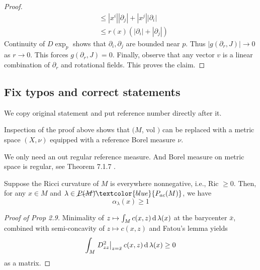 \begin{proof}
\[\begin{aligned}
                                                                     & \leq \left| x ^ { i } \right| \left| \partial _ { j } \right| + \left| x ^ { j } \right| \left| \partial _ { i } \right| \\
                                                                     & \leq r ( x ) \left( \left| \partial _ { i } \right| + \left| \partial _ { j } \right| \right)\end{aligned} \]
	Continuity of \( D \exp _ { p } \) shows that \( \partial _ { i } , \partial _ { j } \) are bounded near \( p .  \)
	Thus \( \left| g \left( \partial _ { r } , J \right) \right| \rightarrow 0 \) as \( r \rightarrow 0 .  \)
	This forces \( g \left( \partial _ { r } , J \right) = 0 .\)
	Finally, observe that any vector \( v \) is a linear combination of \( \partial _ { r } \) and rotational fields.
	This proves the claim.
\end{proof}

\subsection{Fix typos and correct statements}

We copy original statement and put reference number directly after it.

\begin{rmk}[Remark 2.2]
	Inspection of the proof above shows that \( ( M \), vol \( ) \) can be replaced with a  metric space \( ( X , \nu ) \) equipped with a reference Borel measure \( \nu \).
\end{rmk}

We only need an out regular reference measure. And Borel measure on metric space is regular, see Theorem 7.1.7 \cite{Bogachev2007}.

\begin{prop}
	Suppose the Ricci curvature of \( M \) is everywhere nonnegative, i.e., Ric \( \geq 0 . \) Then, for any \( x \in M \) and \( \lambda \in \cancel{P ( M )} \textcolor{blue}{P_{ac}(M)} \), we have
	\[ \alpha _ { \lambda } ( x ) \geq 1 \]
\end{prop}

\begin{proof}[Proof of Prop 2.9]
	Minimality of \( z \mapsto \int _ { M } c ( x , z ) \operatorname{d} \lambda ( x ) \) at the barycenter \( \bar { x } \), combined with semi-concavity of \( z \mapsto c ( x , z ) \) and Fatou's lemma yields
	\[
		\int _ { M } \left. D _ { z z } ^ { 2 } \right| _ { z = \bar { x } } c ( x , z ) \operatorname{d} \lambda ( x ) \geq 0
	\] as a matrix.
\end{proof}

